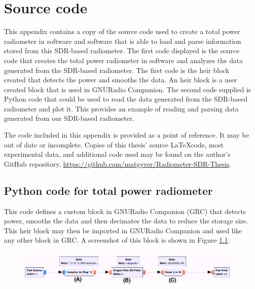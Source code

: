 \appendixtitle
\appendix
\chapter{Source code} \label{appendix1}
This appendix contains a copy of the source code used to create a total power radiometer in software and software that is able to load and parse information stored from this SDR-based radiometer.  The first code displayed is the source code that creates the total power radiometer in software and analyzes the data generated from the SDR-based radiometer. The first code is the heir block created that detects the power and smooths the data.  An heir block is a user created block that is used in GNURadio Companion.  The second code supplied is Python code that could be used to read the data generated from the SDR-based radiometer and plot it.  This provides an example of reading and parsing data generated from our SDR-based radiometer.

The code included in this appendix is provided as a point of reference.  It may be out of date or incomplete.  Copies of this thesis' source \LaTeX code, most experimental data, and additional code used may be found on the author's GitHub repository, \url{https://github.com/matgyver/Radiometer-SDR-Thesis}.

\section*{Python code for total power radiometer}
This code defines a custom block in GNURadio Companion (GRC) that detects power, smooths the data and then decimates the data to reduce the storage size. This heir block may then be imported in GNURadio Companion and used like any other block in GRC.  A screenshot of this block is shown in Figure \ref{TPR_GRC}.

{\begin{figure}[h!tb] 
\centering
\includegraphics[width=0.8\linewidth]{Images/TPR_grc.png}
\label{TPR_GRC}
\end{figure}
}



